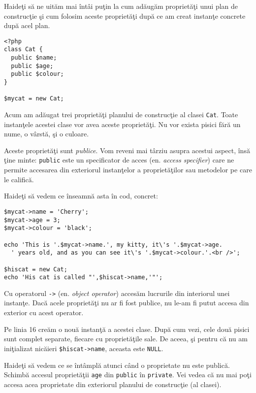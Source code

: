Haideţi să ne uităm mai întâi puţin la cum adăugăm proprietăţi unui plan de construcţie
şi cum folosim aceste proprietăţi după ce am creat instanţe concrete după acel plan.

\begin{lstlisting}[title=Public Class Properties]
<?php
class Cat {
  public $name;
  public $age;
  public $colour;
}

$mycat = new Cat;
\end{lstlisting}

Acum am adăugat trei proprietăţi planului de construcţie al clasei \texttt{Cat}. Toate
instanţele acestei clase vor avea aceste proprietăţi. Nu vor exista pisici fără un
nume, o vârstă, şi o culoare.

Aceste proprietăţi sunt \textsl{publice}. Vom reveni mai târziu asupra acestui aspect,
însă ţine minte: \texttt{public} este un specificator de acces (en. \textsl{access specifier})
care ne permite accesarea din exteriorul instanţelor a proprietăţilor sau metodelor pe 
care le califică.

Haideţi să vedem ce înseamnă asta în cod, concret:
\begin{lstlisting}[firstnumber=9,title={Public Class Properties}]
$mycat->name = 'Cherry';
$mycat->age = 3;
$mycat->colour = 'black';

echo 'This is '.$mycat->name.', my kitty, it\'s '.$mycat->age.
  ' years old, and as you can see it\'s '.$mycat->colour.'.<br />';

$hiscat = new Cat;
echo 'His cat is called "',$hiscat->name,'"';
\end{lstlisting}

Cu operatorul \texttt{->} (en. \textsl{object operator}) accesăm lucrurile din interiorul unei instanţe.
Dacă acele proprietăţi nu ar fi fost publice, nu le-am fi putut accesa din exterior
cu acest operator.

Pe linia 16 creăm o nouă instanţă a acestei clase. După cum vezi, cele două pisici sunt complet
separate, fiecare cu proprietăţile sale. De aceea, şi pentru
că nu am iniţializat nicăieri \texttt{\$hiscat->name}, aceasta este \texttt{NULL}.


Haideţi să vedem ce se întâmplă atunci când o proprietate nu este publică.
Schimbă accesul proprietăţii \texttt{age} din \texttt{public}
în \texttt{private}. Vei vedea că nu mai poţi accesa acea proprietate din exteriorul planului
de construcţie (al clasei).

